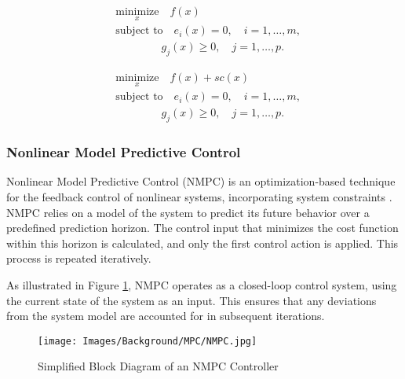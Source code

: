 \begin{minipage}[t]{0.45\textwidth}
    \begin{equation}
        \begin{aligned}
            &\underset{x}{\text{minimize}} \quad f(x) \\
            &\text{subject to} \quad e_i(x) = 0, \quad i = 1, \dots, m, \\
            &\quad \quad \quad \quad \, g_j(x) \geq 0, \quad j = 1, \dots, p.
        \end{aligned}
        \label{eq:optimization_problem}
    \end{equation}
\end{minipage}%
\hfill
\begin{minipage}[t]{0.45\textwidth}
    \begin{equation}
        \begin{aligned}
            &\underset{x}{\text{minimize}} \quad f(x) + sc(x) \\
            &\text{subject to} \quad e_i(x) = 0, \quad i = 1, \dots, m, \\
            &\quad \quad \quad \quad \, g_j(x) \geq 0, \quad j = 1, \dots, p.
        \end{aligned}
        \label{eq:optimization_problem_with_soft_constraint}
    \end{equation}
\end{minipage}

\subsubsection{Nonlinear Model Predictive Control}

Nonlinear Model Predictive Control (NMPC) is an optimization-based technique for the feedback control of nonlinear systems, incorporating system constraints \cite{grune2017nonlinearmpc}. NMPC relies on a model of the system to predict its future behavior over a predefined prediction horizon. The control input that minimizes the cost function within this horizon is calculated, and only the first control action is applied. This process is repeated iteratively.

As illustrated in Figure \ref{fig:simplified_mpc_control_loop}, NMPC operates as a closed-loop control system, using the current state of the system as an input. This ensures that any deviations from the system model are accounted for in subsequent iterations.

\begin{figure}[h]
    \centering
    \texttt{[image: Images/Background/MPC/NMPC.jpg]}
    \caption{Simplified Block Diagram of an NMPC Controller}
    \label{fig:simplified_mpc_control_loop}
\end{figure}

